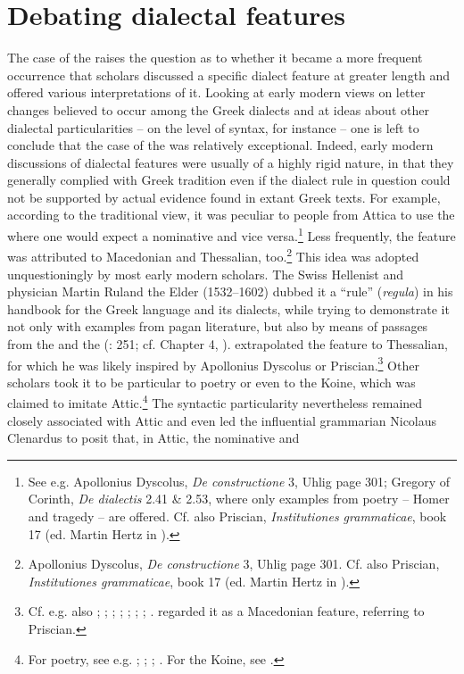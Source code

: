 \section{Debating dialectal features}\label{sec:6.4}

The case of the  raises the question as to whether it became a more frequent occurrence that scholars discussed a specific dialect feature at greater length and offered various interpretations of it. Looking at early modern views on letter changes believed to occur among the Greek dialects and at ideas about other dialectal particularities – on the level of syntax, for instance – one is left to conclude that the case of the  was relatively exceptional. Indeed, early modern discussions of dialectal features were usually of a highly rigid nature, in that they generally complied with Greek tradition even if the dialect rule in question could not be supported by actual evidence found in extant Greek texts. For example, according to the traditional view, it was peculiar to people from Attica to use the  where one would expect a nominative and vice versa.\footnote{See e.g. Apollonius Dyscolus, \textit{De constructione} 3, Uhlig page 301; Gregory of Corinth, \textit{De dialectis} 2.41 \& 2.53, where only examples from poetry – Homer and tragedy – are offered. Cf. also Priscian, \textit{Institutiones grammaticae}, book 17 (ed. Martin Hertz in \citealt[208]{Keil1859}).} Less frequently, the feature was attributed to Macedonian and Thessalian, too.\footnote{Apollonius Dyscolus, \textit{De constructione} 3, Uhlig page 301. Cf. also Priscian, \textit{Institutiones grammaticae}, book 17 (ed. Martin Hertz in \citealt[208]{Keil1859}).} This idea was adopted unquestioningly by most early modern scholars. The Swiss Hellenist and physician Martin Ruland the Elder (1532–1602) dubbed it a “rule” (\textit{regula}) in his handbook for the Greek language and its dialects, while trying to demonstrate it not only with examples from pagan literature, but also by means of passages from the  and the  (\citealt{Ruland1556}: 251; cf. Chapter 4, ). \citet[302]{Ruland1556} extrapolated the feature to Thessalian, for which he was likely inspired by Apollonius Dyscolus or Priscian.\footnote{Cf. e.g. also ; \citet[216]{Vergara1537}; \citet[50\textsc{\textsuperscript{v}}]{Nunez1555}; \citet[\textsc{x.1}\textsc{\textsuperscript{v}}]{Dabercusius1577}; \citet[5, second pagination sequence]{Rhenius1626}; \citet[8--9]{Pasor1632}; \citet[85-87]{Wyss1650}; \citet[88]{Leusden1670}. \citet[\textsc{b.3}\textsc{\textsuperscript{r}}]{Kirchmaier1709} regarded it as a Macedonian feature, referring to Priscian.} Other scholars took it to be particular to poetry or even to the Koine, which was claimed to imitate Attic.\footnote{For poetry, see e.g. \citet[\textsc{q.}i\textsc{\textsuperscript{v}}]{Amerot1520}; \citet[129]{Antesignanus1554}; \citet[34]{Gretser1593}; \citet[157]{Schmidt1604}. For the Koine, see \citet[54]{Lancelot1655}.} The syntactic particularity nevertheless remained closely associated with Attic and even led the influential grammarian Nicolaus Clenardus to posit that, in Attic, the nominative and 